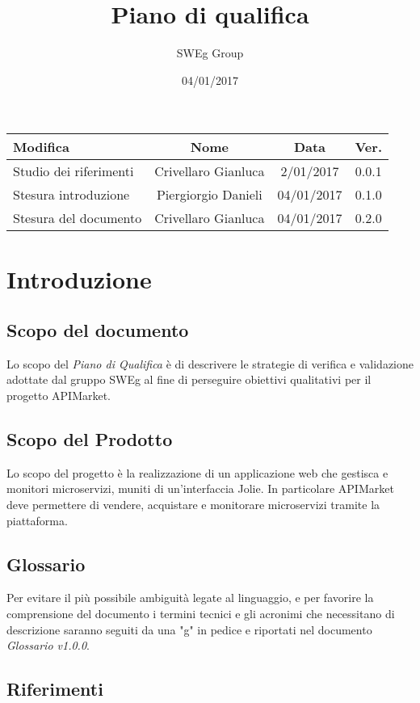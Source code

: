 \documentclass[12pt,a4paper,titlepage]{article}
\begin{document}
 
	\title{Piano di qualifica}
	\author{SWEg Group}
	\date{04/01/2017}
	\maketitle
	{\renewcommand\arraystretch{1.2}
		\begin{table}
			\centering
			\begin{tabular}{|l|c|c|c|}
				\hline
				{\textbf{Modifica}}&{\textbf{Nome}}&{\textbf{Data}}&{\textbf{Ver.}}\\
				\hline
				Studio dei riferimenti & Crivellaro Gianluca & 2/01/2017 & 0.0.1 \\
				\hline
				Stesura introduzione & Piergiorgio Danieli & 04/01/2017 & 0.1.0 \\
				\hline
				Stesura del documento & Crivellaro Gianluca & 04/01/2017 & 0.2.0 \\
				\hline
			\end{tabular}
		\end{table}
	}
	\newpage
	
	\tableofcontents
	\thispagestyle{empty}
	\newpage
	\section{Introduzione}
	\subsection{Scopo del documento}
	Lo scopo del \textit{Piano di Qualifica} è di descrivere le strategie di verifica e validazione adottate dal gruppo SWEg al fine di perseguire obiettivi qualitativi per il progetto APIMarket.
	\subsection{Scopo del Prodotto}
	Lo scopo del progetto è la realizzazione di un applicazione web che gestisca e monitori microservizi, muniti di un'interfaccia Jolie. In particolare APIMarket deve permettere di vendere, acquistare e monitorare microservizi tramite la piattaforma. 
	\subsection{Glossario}
	Per evitare il più possibile ambiguità legate al linguaggio, e per favorire la comprensione del documento i termini tecnici e gli acronimi che necessitano di descrizione saranno seguiti da una "g" in pedice e riportati nel documento \textit{Glossario v1.0.0}.
	\subsection{Riferimenti}
\end{document}
